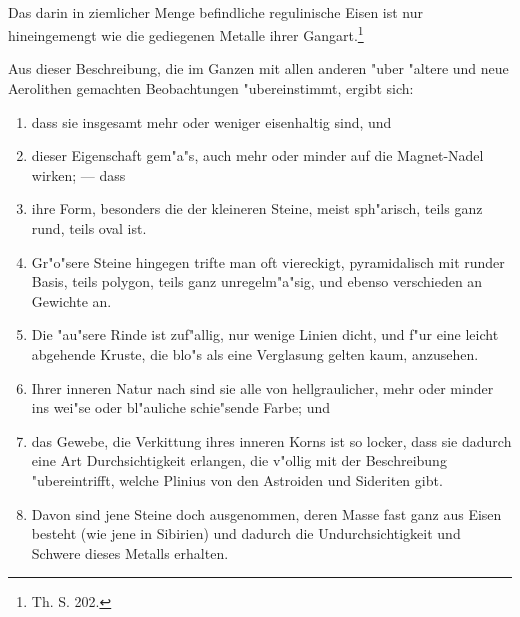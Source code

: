 \documentclass[a4paper, 11pt, oneside, polutonikogreek, german]{article}
\begin{document}
\paragraph{}
Das darin in ziemlicher Menge befindliche regulinische Eisen ist nur hineingemengt wie die gediegenen Metalle ihrer Gangart.\footnote{ Th. S. 202.}

Aus dieser Beschreibung, die im Ganzen mit allen anderen "uber "altere und neue Aerolithen gemachten Beobachtungen "ubereinstimmt, ergibt sich:
\begin{enumerate}
    \item dass sie insgesamt mehr oder weniger eisenhaltig sind, und
    \item dieser Eigenschaft gem"a"s, auch mehr oder minder auf die Magnet-Nadel wirken; --- dass
    \item ihre Form, besonders die der kleineren Steine, meist sph"arisch, teils ganz rund, teils oval ist.
    \item Gr"o"sere Steine hingegen trifte man oft viereckigt, pyramidalisch mit runder Basis, teils polygon, teils ganz unregelm"a"sig, und ebenso verschieden an Gewichte an.
    \item Die "au"sere Rinde ist zuf"allig, nur wenige Linien dicht, und f"ur eine leicht abgehende Kruste, die blo"s als eine Verglasung gelten kaum, anzusehen.
    \item Ihrer inneren Natur nach sind sie alle von hellgraulicher, mehr oder minder ins wei"se oder bl"auliche schie"sende Farbe; und
    \item das Gewebe, die Verkittung ihres inneren Korns ist so locker, dass sie dadurch eine Art Durchsichtigkeit erlangen, die v"ollig mit der Beschreibung "ubereintrifft, welche Plinius von den Astroiden und Sideriten gibt.
    \item Davon sind jene Steine doch ausgenommen, deren Masse fast ganz aus Eisen besteht (wie jene in Sibirien) und dadurch die Undurchsichtigkeit und Schwere dieses Metalls erhalten.
\end{enumerate}
\end{document}
